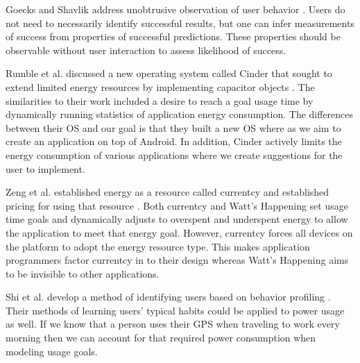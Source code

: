 Goecks and Shavlik address unobtrusive observation of user behavior \cite{Goecks:2000:LUI:325737.325806}. 
Users do not need to necessarily identify successful results, but one can infer measurements of success from properties of successful predictions. 
These properties should be observable without user interaction to assess likelihood of success. 


Rumble et al. discussed a new operating system called Cinder that sought to extend limited energy resources by implementing capacitor objects \cite{Rumble:2009:AJT:1592606.1592618}. 
The similarities to their work included a desire to reach a goal usage time by dynamically running statistics of application energy consumption. 
The differences between their OS and our goal is that they built a new OS where as we aim to create an application on top of Android. 
In addition, Cinder actively limits the energy consumption of various applications where we create suggestions for the user to implement. 

Zeng et al. established energy as a resource called currentcy and established pricing for using that resource \cite{Zeng:2003:CUA:1247340.1247344}. 
Both currentcy and Watt's Happening set usage time goals and dynamically adjusts to overspent and underspent energy to allow the application to meet that energy goal. 
However, currentcy forces all devices on the platform to adopt the energy resource type. 
This makes application programmers factor currentcy in to their design whereas Watt's Happening aims to be invisible to other applications. 

Shi et al. develop a method of identifying users based on behavior profiling \cite{learningUserBehavior}. 
Their methods of learning users' typical habits could be applied to power usage as well. 
If we know that a person uses their GPS when traveling to work every morning then we can account for that required power consumption when modeling usage goals. 

